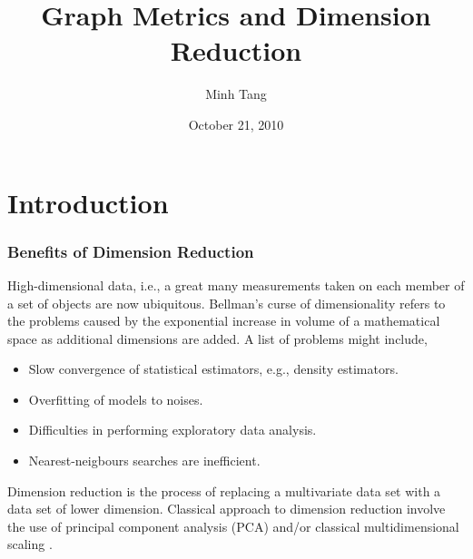 \documentclass[professionalfonts, hyperref={pdfpagelabels=false,
  colorlinks=true, linkcolor=purple}]{beamer}
\begin{document}
\title[Graph Metrics and Dimension Reduction]{Graph Metrics and
  Dimension Reduction}
\author[Tang]{Minh Tang}

\date{October 21, 2010}

\begin{frame}
\titlepage
\end{frame}
\section{Introduction}
\begin{frame}
  \frametitle{Benefits of Dimension Reduction}
  High-dimensional data, i.e., a great many measurements taken on each
  member of a set of objects are now ubiquitous. Bellman's
  \alert{curse of dimensionality} \cite{bellman57:_dynam} refers to
  the problems caused by the exponential increase in volume of a
  mathematical space as additional dimensions are added. A list of
  problems might include,
  
  \begin{itemize}
  \item Slow convergence of statistical estimators, e.g., density
    estimators. 
  \item Overfitting of models to noises.
  \item Difficulties in performing exploratory data analysis.
  \item Nearest-neigbours searches are inefficient.
  \end{itemize}
  
  Dimension reduction is the process of replacing a
  multivariate data set with a data set of lower dimension. Classical
  approach to dimension reduction involve the use of principal
  component analysis (PCA) \cite{pearson01:_on,hotelling33:_analy}
  and/or classical multidimensional scaling
  \cite{torgesen52:_multid,gower66:_some}.
\end{frame}
\end{document}
